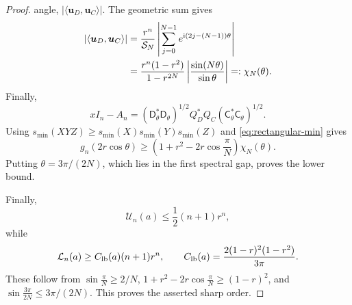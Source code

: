 \documentclass[review,hidelinks,onefignum,onetabnum]{siamart251216}
\newcommand{\ii}{\mathrm i}
\begin{document}
\begin{proof}
angle, \(|\langle\boldsymbol u_D,\boldsymbol u_C\rangle|\).  The
geometric sum gives
\begin{align}
 |\langle\boldsymbol u_D,\boldsymbol u_C\rangle|
 &=\frac{r^n}{\mathcal S_N}
 \left|\sum_{j=0}^{N-1}e^{\ii(2j-(N-1))\theta}\right|\notag\\
 &=
 \frac{r^n(1-r^2)}{1-r^{2N}}
 \left|\frac{\sin(N\theta)}{\sin\theta}\right|
 =:\chi_N(\theta).
\label{eq:chi}
\end{align}
Finally,
\[
 xI_n-A_n=(\mathsf{D}_\theta^*\mathsf{D}_\theta)^{1/2}
 Q_D^*Q_C(\mathsf{C}_\theta^*\mathsf{C}_\theta)^{1/2}.
\]
Using \(s_{\min}(XYZ)\geq
s_{\min}(X)s_{\min}(Y)s_{\min}(Z)\) and
\eqref{eq:rectangular-min} gives
\[
 g_n(2r\cos\theta)\geq
 \left(1+r^2-2r\cos\frac{\pi}{N}\right)\chi_N(\theta).
\]
Putting \(\theta=3\pi/(2N)\), which lies in the first spectral gap,
proves the lower bound.

Finally,
\[
 \mathcal U_n(a)\leq\frac12(n+1)r^n,
\]
while
\begin{equation}\label{eq:L-simple}
 \mathcal L_n(a)\geq C_{\rm lb}(a)(n+1)r^n,\qquad
 C_{\rm lb}(a)=\frac{2(1-r)^2(1-r^2)}{3\pi}.
\end{equation}
These follow from
\(\sin\frac{\pi}{N}\geq2/N\),
\(1+r^2-2r\cos\frac{\pi}{N}\geq(1-r)^2\), and
\(\sin\frac{3\pi}{2N}\leq3\pi/(2N)\).  This proves the asserted sharp
order.
\end{proof}
\end{document}
